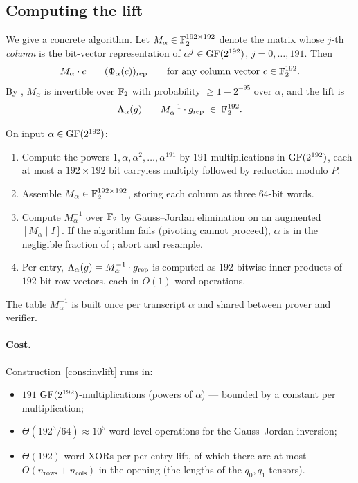 \subsection{Computing the lift}

We give a concrete algorithm. Let $M_\alpha \in \mathbb{F}_2^{192 \times 192}$
denote the matrix whose $j$-th \emph{column} is the bit-vector
representation of $\alpha^j \in \mathrm{GF}(2^{192})$, $j = 0, \ldots, 191$. Then
\[
  M_\alpha \cdot c \;=\; (\Phi_\alpha(c))_{\mathrm{rep}}
  \qquad \text{for any column vector } c \in \mathbb{F}_2^{192}.
\]
By , $M_\alpha$ is invertible over $\mathbb{F}_2$
with probability $\ge 1 - 2^{-95}$ over $\alpha$, and the lift is
\[
  \Lambda_{\alpha}(g) \;=\; M_\alpha^{-1} \cdot g_{\mathrm{rep}} \;\in\; \mathbb{F}_2^{192}.
\]

\begin{construction}
\label{cons:invlift}
On input $\alpha \in \mathrm{GF}(2^{192})$:
\begin{enumerate}[leftmargin=2em]
  \item Compute the powers $1, \alpha, \alpha^2, \ldots, \alpha^{191}$
    by $191$ multiplications in $\mathrm{GF}(2^{192})$, each at most a $192\times 192$
    bit carryless multiply followed by reduction modulo $P$.
  \item Assemble $M_\alpha \in \mathbb{F}_2^{192 \times 192}$, storing each
    column as three $64$-bit words.
  \item Compute $M_\alpha^{-1}$ over $\mathbb{F}_2$ by Gauss--Jordan
    elimination on an augmented $[M_\alpha \mid I]$. If the algorithm
    fails (pivoting cannot proceed), $\alpha$ is in the negligible
    fraction of ; abort and resample.
  \item Per-entry, $\Lambda_{\alpha}(g) = M_\alpha^{-1} \cdot g_{\mathrm{rep}}$
    is computed as $192$ bitwise inner products of $192$-bit row
    vectors, each in $O(1)$ word operations.
\end{enumerate}
The table $M_\alpha^{-1}$ is built once per transcript $\alpha$ and
shared between prover and verifier.
\end{construction}

\paragraph{Cost.} Construction~\ref{cons:invlift} runs in:
\begin{itemize}[leftmargin=2em]
  \item $191$ $\mathrm{GF}(2^{192})$-multiplications (powers of $\alpha$) — bounded
    by a constant per multiplication;
  \item $\Theta(192^3 / 64) \approx 10^5$ word-level operations for
    the Gauss--Jordan inversion;
  \item $\Theta(192)$ word XORs per per-entry lift, of which there are
    at most $O(n_{\mathrm{rows}} + n_{\mathrm{cols}})$ in the
    opening (the lengths of the $q_0, q_1$ tensors).
\end{itemize}

